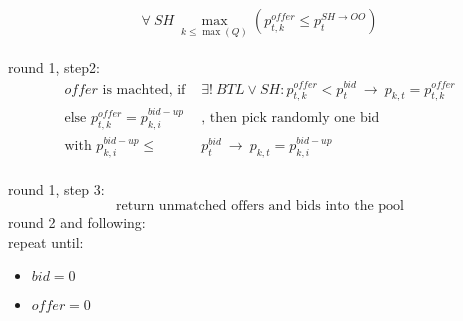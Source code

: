 \documentclass[]{article}
\begin{document}
\begin{equation*}
\forall\  SH\ \max_{k\leq \max(Q)} \left(p^{offer}_{t,k}\leq p^{SH\rightarrow OO}_{t}\right) 
\end{equation*}
\\
round 1, step2:
\begin{equation}\label{eq:realised_price}
	\begin{split}
		offer\text{ is machted, if }& \exists!\ BTL \lor SH: p^{offer}_{t,k}<p^{bid}_{t} \ \rightarrow \  p_{k,t}=p^{offer}_{t,k} \\
		\text{else } p^{offer}_{t,k}=p^{bid-up}_{k,i}&\text{, then pick randomly one bid }\\
		\text{with } p^{bid-up}_{k,i} \leq  &p^{bid}_{t} \ \rightarrow \  p_{k,t}=p^{bid-up}_{k,i} 
	\end{split}
\end{equation}
\\
round 1, step 3:
\begin{equation*}
\text{return unmatched offers and bids into the pool}
\end{equation*}
round 2 and following:
\\
repeat until: \begin{itemize}
	\item $bid=0$
	\item $offer =0$
\end{itemize}
\end{document}
